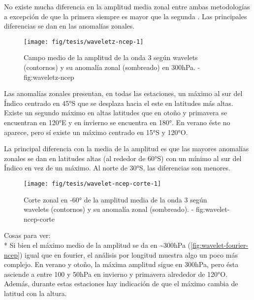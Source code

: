 \documentclass[spanish,a4paper]{book}
\begin{document}
No existe mucha diferencia en la amplitud media zonal entre ambas
metodologías a excepción de que la primera siempre es mayor que la
segunda
.
Las principales diferencias se dan en las anomalías zonales.

\begin{figure}

{\centering \texttt{[image: fig/tesis/waveletz-ncep-1]} 

}

\caption{Campo medio de la amplitud de la onda 3 según wavelets (contornos) y su anomalía zonal (sombreado) en 300hPa. - fig:waveletz-ncep}\label{fig:waveletz-ncep}
\end{figure}

Las anomalías zonales presentan, en todas las estaciones, un máximo al
sur del Índico centrado en 45°S que se desplaza hacia el este en
latitudes más altas. Existe un segundo máximo en altas latitudes que en
otoño y primavera se encuentran en 120°E y en invierno se encuentra en
180°. En verano éste no aparece, pero sí existe un máximo centrado en
15°S y 120°O.

La principal diferencia con la media de la amplitud es que las mayores
anomalías zonales se dan en latitudes altas (al rededor de 60°S) con un
mínimo al sur del Índico en vez de un máximo. Al norte de 30°S, las
diferencias son menores.


\begin{figure}

{\centering \texttt{[image: fig/tesis/wavelet-ncep-corte-1]} 

}

\caption{Corte zonal en -60° de la amplitud media de la onda 3 según wavelets (contornos) y su anomalía zonal (sombreado). - fig:wavelet-ncep-corte}\label{fig:wavelet-ncep-corte}
\end{figure}

Cosas para ver:\\
* Si bien el máximo medio de la amplitud se da en
\textasciitilde{}300hPa (\autoref{fig:wavelet-fourier-ncep}) igual que
en fourier, el análisis por longitud muestra algo un poco más complejo.
En verano y otoño, la máxima amplitud sigue en 300hPa, pero ésta
asciende a entre 100 y 50hPa en invierno y primavera alrededor de 120°O.
Además, durante estas estaciones hay indicación de que el máximo cambia
de latitud con la altura.
\end{document}
